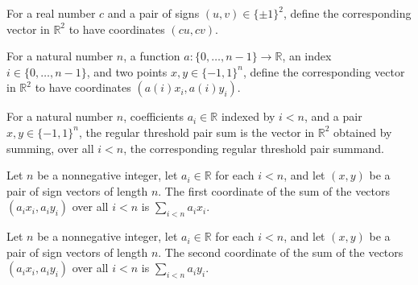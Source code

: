 \begin{definition}
\label{FABL.regularCorrelatedSignSummand}
\leanok
{}
For a real number $c$ and a pair of signs $(u,v)\in\{\pm1\}^2$, define the corresponding
vector in $\mathbb R^2$ to have coordinates $(cu,cv)$.
\end{definition}

\begin{definition}
\label{FABL.regularThresholdPairSummand}
\leanok
{}
For a natural number $n$, a function $a:\{0,\ldots,n-1\}\to\mathbb R$, an index
$i\in\{0,\ldots,n-1\}$, and two points $x,y\in\{-1,1\}^n$, define the corresponding
vector in $\mathbb R^2$ to have coordinates $(a(i)x_i,a(i)y_i)$.
\end{definition}

\begin{definition}
\label{FABL.regularThresholdPairSum}
\leanok
{}
For a natural number $n$, coefficients $a_i\in\mathbb{R}$ indexed by $i<n$, and a pair
$x,y\in\{-1,1\}^n$, the regular threshold pair sum is the vector in $\mathbb{R}^2$
obtained by summing, over all $i<n$, the corresponding regular threshold pair summand.
\end{definition}

\begin{theorem}
\label{FABL.regularThresholdPairSum_apply_zero}
\leanok
{}
Let $n$ be a nonnegative integer, let $a_i\in\mathbb{R}$ for each $i<n$, and let $(x,y)$
be a pair of sign vectors of length $n$. The first coordinate of the sum of the vectors
$(a_i x_i,a_i y_i)$ over all $i<n$ is $\sum_{i<n}a_i x_i$.
\end{theorem}

\begin{theorem}
\label{FABL.regularThresholdPairSum_apply_one}
\leanok
{}
Let $n$ be a nonnegative integer, let $a_i\in\mathbb{R}$ for each $i<n$, and let $(x,y)$
be a pair of sign vectors of length $n$. The second coordinate of the sum of the vectors
$(a_i x_i,a_i y_i)$ over all $i<n$ is $\sum_{i<n}a_i y_i$.
\end{theorem}


